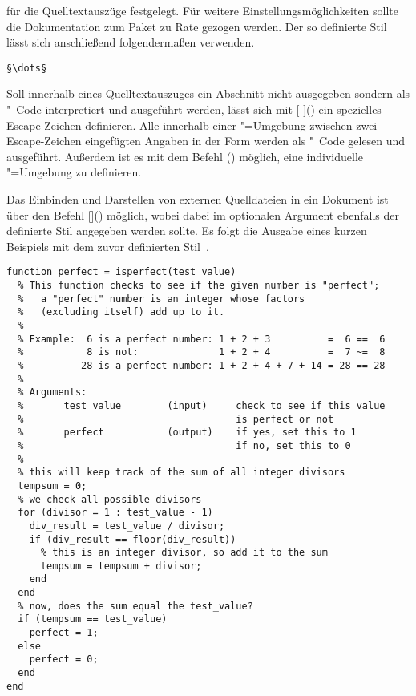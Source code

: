\documentclass[%
  english,ngerman,%
  cdgeometry=no,DIV=12,%
  cd=false,cdfont=false,cdtitle=true,%
  headings=normal,%
  automark,%
  listof=toc,%
]{tudscrartcl}
\begin{document}
für die Quelltextauszüge festgelegt. Für weitere Einstellungsmöglichkeiten 
sollte die Dokumentation zum Paket zu Rate gezogen werden. Der so definierte 
Stil lässt sich anschließend folgendermaßen verwenden.
%
\begin{Hint}
\begin{lstlisting}[style=matlab]
§\dots§
\end{lstlisting}
\end{Hint}
%
Soll innerhalb eines Quelltextauszuges ein Abschnitt nicht ausgegeben sondern 
als "~Code interpretiert und ausgeführt werden, lässt sich mit 
[%
]() ein spezielles Escape-Zeichen definieren. Alle innerhalb 
einer "=Umgebung zwischen zwei Escape-Zeichen eingefügten 
Angaben in der Form \PValue{\dots} werden als 
"~Code gelesen und ausgeführt. Außerdem ist es mit dem Befehl 
() möglich, eine individuelle 
"=Umgebung zu definieren.

Das Einbinden und Darstellen von externen Quelldateien in ein Dokument ist über 
den Befehl
[\LParameter{}]() 
möglich, wobei dabei im optionalen Argument ebenfalls der definierte Stil 
angegeben werden sollte. Es folgt die Ausgabe eines kurzen Beispiels mit dem 
zuvor definierten Stil~.
%
\begin{lstlisting}[style=matlab]
function perfect = isperfect(test_value)
  % This function checks to see if the given number is "perfect";
  %   a "perfect" number is an integer whose factors 
  %   (excluding itself) add up to it.
  %
  % Example:  6 is a perfect number: 1 + 2 + 3          =  6 ==  6
  %           8 is not:              1 + 2 + 4          =  7 ~=  8
  %          28 is a perfect number: 1 + 2 + 4 + 7 + 14 = 28 == 28
  %
  % Arguments:
  %       test_value        (input)     check to see if this value 
  %                                     is perfect or not
  %       perfect           (output)    if yes, set this to 1
  %                                     if no, set this to 0
  %
  % this will keep track of the sum of all integer divisors
  tempsum = 0;
  % we check all possible divisors
  for (divisor = 1 : test_value - 1)
    div_result = test_value / divisor;
    if (div_result == floor(div_result)) 
      % this is an integer divisor, so add it to the sum
      tempsum = tempsum + divisor;
    end
  end
  % now, does the sum equal the test_value?
  if (tempsum == test_value) 
    perfect = 1;
  else
    perfect = 0;
  end
end
\end{lstlisting}
\end{document}
